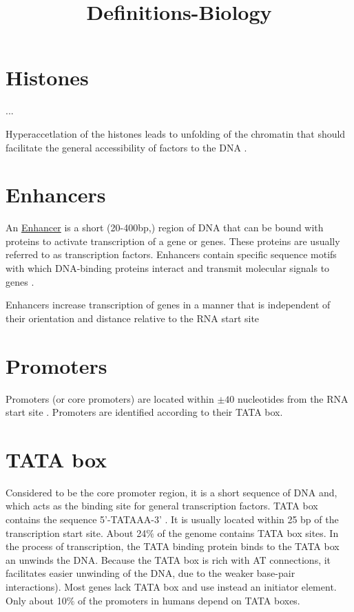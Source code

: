 \documentclass[12pt]{paper}
\begin{document}
\title{Definitions-Biology}
\maketitle
\section{Histones}
...

Hyperaccetlation of the histones leads to unfolding of the chromatin that should facilitate the general accessibility of factors to the DNA \cite{Blackwood98}.

\section{Enhancers}
 An \href{http://en.wikipedia.org/wiki/Enhancer_(genetics)}{Enhancer} is a short (20-400bp,\cite{Kulaeva12}) region of DNA that can be bound with proteins to activate transcription of a gene or genes. These proteins are usually referred to as transcription factors. Enhancers contain  specific sequence motifs with which DNA-binding proteins interact and transmit molecular signals to genes \cite{Blackwood98}.

Enhancers increase transcription of genes in a manner that is independent of their orientation and distance relative to the RNA start site \cite{Blackwood98} 


\section{Promoters}
Promoters (or core promoters) are located within $\pm 40$ nucleotides from the RNA start site \cite{Blackwood98}. Promoters are identified according to their TATA box. 


\section{TATA box}
Considered to be the core promoter region, it is a short sequence of DNA and, which acts as the binding site for general transcription factors. TATA box contains the sequence 5'-TATAAA-3' . It is usually located within 25 bp of the transcription start site. About 24$\%$ of the genome contains TATA box sites. In the process of transcription, the TATA binding protein binds to the TATA box an unwinds the DNA. Because the TATA box is rich with AT connections, it facilitates easier unwinding of the DNA, due to the weaker base-pair interactions). Most genes lack TATA box and use instead an initiator element. Only about 10$\%$ of the promoters in humans depend on TATA boxes. 
\end{document}
